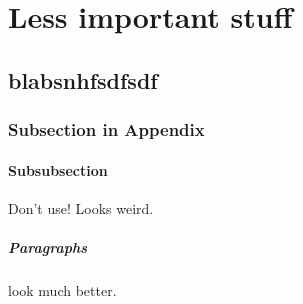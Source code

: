 \chapter{Less important stuff}
\section{blabsnhfsdfsdf}
\subsection{Subsection in Appendix}
\subsubsection{Subsubsection}
Don't use! Looks weird.
\paragraph{Paragraphs} look much better.